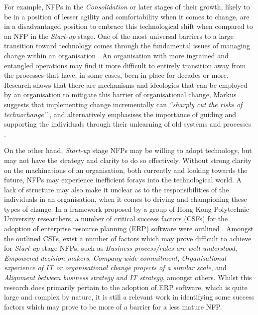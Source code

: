 For example, NFPs in the \emph{Consolidation} or later stages of their growth, likely to be in a position of lesser agility and comfortability when it comes to change, are in a disadvantaged position to embrace this technological shift when compared to an NFP in the \emph{Start-up} stage. One of the most universal barriers to a large transition toward technology comes through the fundamental issues of managing change within an organisation \cite{o2007towards} \cite{schein1994management}. An organisation with more ingrained and entangled operations may find it more difficult to entirely transition away from the processes that have, in some cases, been in place for decades or more. Research shows that there are mechanisms and ideologies that can be employed by an organisation to mitigate this barrier of organisational change, Markus suggests that implementing change incrementally can \emph{“sharply cut the risks of technochange”} \cite{markus2004technochange}, and alternatively emphasises the importance of guiding and supporting the individuals through their unlearning of old systems and processes \cite{becker2010facilitating}.

On the other hand, \emph{Start-up} stage NFPs may be willing to adopt technology, but may not have the strategy and clarity to do so effectively. Without strong clarity on the machinations of an organisation, both currently and looking towards the future, NFPs may experience inefficient forays into the technological world. A lack of structure may also make it unclear as to the responsibilities of the individuals in an organisation, when it comes to driving and championing these types of change. In a framework proposed by a group of Hong Kong Polytechnic University researchers, a number of critical success factors (CSFs) for the adoption of enterprise resource planning (ERP) software were outlined \cite{ngai2008examining}. Amongst the outlined CSFs, exist a number of factors which may prove difficult to achieve for \emph{Start-up} stage NFPs, such as \emph{Business process/rules are well understood}, \emph{Empowered decision makers}, \emph{Company-wide commitment}, \emph{Organisational experience of IT or organisational change projects of a similar scale}, and \emph{Alignment between business strategy and IT strategy}, amongst others. Whilst this research does primarily pertain to the adoption of ERP software, which is quite large and complex by nature, it is still a relevant work in identifying some success factors which may prove to be more of a barrier for a less mature NFP.

